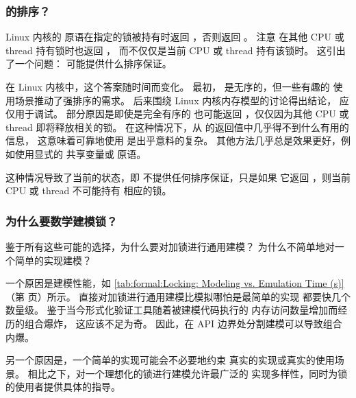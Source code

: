 \subsubsection{的排序？}
\label{sec:memorder:Ordering for spin-is-locked()?}

Linux 内核的  原语在指定的锁被持有时返回
，否则返回 。
注意  在其他 CPU 或 thread 持有锁时也返回 ，
而不仅仅是当前 CPU 或 thread 持有该锁时。
这引出了一个问题：
可能提供什么排序保证。

在 Linux 内核中，这个答案随时间而变化。
最初， 是无序的，但一些有趣的
使用场景推动了强排序的需求。
后来围绕 Linux 内核内存模型的讨论得出结论，
 应仅用于调试。
部分原因是即使是完全有序的
 也可能返回 ，仅仅因为其他 CPU 或
thread 即将释放相关的锁。
在这种情况下，从  的返回值中几乎得不到什么有用的信息，
这意味着可靠地使用 
是出乎意料的复杂。
其他方法几乎总是效果更好，例如使用显式的
共享变量或  原语。

这种情况导致了当前的状态，即
 不提供任何排序保证，只是如果
它返回 ，则当前 CPU 或 thread 不可能持有
相应的锁。

\QuickQuizEnd

\subsubsection{为什么要数学建模锁？}
\label{sec:memorder:Why Mathematically Model Locking?}

鉴于所有这些可能的选择，为什么要对加锁进行通用建模？
为什么不简单地对一个简单的实现建模？

一个原因是建模性能，如
\cref{tab:formal:Locking: Modeling vs. Emulation Time (s)}
（第
 页）所示。
直接对加锁进行通用建模比模拟哪怕是最简单的实现
都要快几个数量级。
鉴于当今形式化验证工具随着被建模代码执行的
内存访问数量增加而经历的组合爆炸，
这应该不足为奇。
因此，在 API 边界处分割建模可以导致组合内爆。

另一个原因是，一个简单的实现可能会不必要地约束
真实的实现或真实的使用场景。
相比之下，对一个理想化的锁进行建模允许最广泛的
实现多样性，同时为锁的使用者提供具体的指导。

